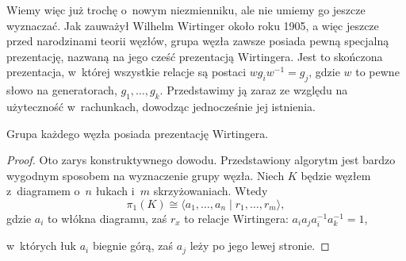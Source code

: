 Wiemy więc już trochę o~nowym niezmienniku, ale nie umiemy go jeszcze wyznaczać.
Jak zauważył Wilhelm Wirtinger około roku 1905, a więc jeszcze przed narodzinami teorii węzłów, grupa węzła zawsze posiada pewną specjalną prezentację, nazwaną na jego cześć prezentacją Wirtingera.
Jest to skończona prezentacja, w~której wszystkie relacje są postaci $w g_i w^{-1} = g_j$, gdzie $w$ to pewne słowo na generatorach, $g_1, \ldots, g_k$.
Przedstawimy ją zaraz ze względu na użyteczność w~rachunkach, dowodząc jednocześnie jej istnienia.

\begin{proposition}
    \label{prop:wirtinger}
    Grupa każdego węzła posiada prezentację Wirtingera.
\end{proposition}

\begin{proof}
    Oto zarys konstruktywnego dowodu.
    Przedstawiony algorytm jest bardzo wygodnym sposobem na wyznaczenie grupy węzła.
    Niech $K$ będzie węzłem z~diagramem o~$n$ łukach i~$m$ skrzyżowaniach.
    Wtedy
    \begin{equation}
        \pi_1(K) \cong \langle a_1, \ldots, a_n \mid r_1, \ldots, r_m\rangle,
    \end{equation}
    gdzie $a_i$ to włókna diagramu, zaś $r_x$ to relacje Wirtingera: $a_ia_ja_i^{-1}a_k^{-1}=1$,
\begin{comment}
    \[
    \begin{tikzpicture}[baseline=-0.65ex,scale=0.15]
    \begin{knot}[clip width=15]
        \strand[semithick,-Latex] (-5, -5) to (5, 5);
        \strand[semithick,-Latex] (-5, 5) to (5, -5);
        \node[darkblue] at (5, 5)[below right] {$a_i$};
        \node[darkblue] at (5, -5)[above right] {$a_k$};
        \node[darkblue] at (-5, 5)[below left] {$a_j$};
    \end{knot}
    \end{tikzpicture}
    \quad\quad
    \begin{tikzpicture}[baseline=-0.65ex,scale=0.15]
    \begin{knot}[clip width=15, flip crossing/.list={1}]
        \strand[semithick,-Latex] (-5, -5) to (5, 5);
        \strand[semithick,-Latex] (-5, 5) to (5, -5);
        \node[darkblue] at (5, 5)[below right] {$a_j$};
        \node[darkblue] at (-5, -5)[above left] {$a_k$};
        \node[darkblue] at (-5, 5)[below left] {$a_i$};
    \end{knot}
    \end{tikzpicture}
    \]
\end{comment}
    w~których łuk $a_i$ biegnie górą, zaś $a_j$ leży po jego lewej stronie.
\end{proof}

